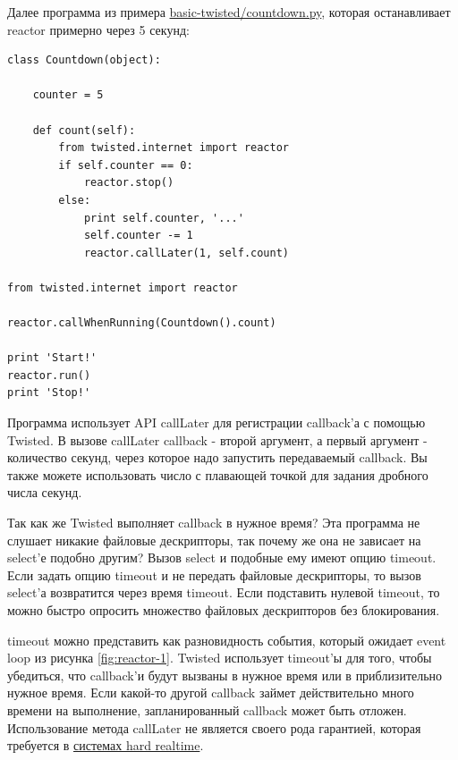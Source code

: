 Далее программа из примера 
\href{http://github.com/jdavisp3/twisted-intro/blob/master/basic-twisted/countdown.py}{basic-twisted/countdown.py}, 
которая останавливает reactor примерно через 5 секунд: 

\begin{scriptsize}\begin{verbatim}
class Countdown(object):

    counter = 5

    def count(self):
        from twisted.internet import reactor
        if self.counter == 0:
            reactor.stop()
        else:
            print self.counter, '...'
            self.counter -= 1
            reactor.callLater(1, self.count)

from twisted.internet import reactor

reactor.callWhenRunning(Countdown().count)

print 'Start!'
reactor.run()
print 'Stop!'
\end{verbatim}\end{scriptsize}


Программа использует API callLater для регистрации callback'а с 
помощью Twisted. В вызове callLater callback - второй аргумент, 
а первый аргумент - количество секунд, через которое надо запустить 
передаваемый callback. Вы также можете использовать число с 
плавающей точкой для задания дробного числа секунд.


Так как же Twisted выполняет callback в нужное время? 
Эта программа  не слушает никакие файловые 
дескрипторы, так почему же она не зависает на select'е 
подобно другим? Вызов select и подобные ему имеют  
опцию timeout. Если задать опцию timeout и не передать 
файловые дескрипторы, то вызов select'а возвратится через 
время timeout. Если подставить нулевой timeout, то можно 
быстро опросить множество файловых дескрипторов 
без блокирования.  


timeout можно представить как разновидность  
события, который ожидает event loop из рисунка \ref{fig:reactor-1}. 
Twisted использует timeout'ы для того, чтобы убедиться, что 
callback'и будут вызваны в нужное время или в приблизительно нужное время. 
Если какой-то другой callback займет действительно 
много времени на выполнение, запланированный callback 
может быть отложен. Использование метода callLater не 
является своего рода гарантией, которая требуется в 
\href{http://en.wikipedia.org/wiki/Real-time\_computing#Hard\_and\_soft\_real-time\_systems}{системах hard realtime}.


